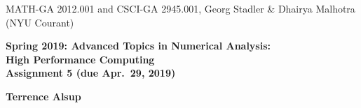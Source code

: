 \documentclass[12pt]{article}
\begin{document}
\begin{center}
  \vspace*{-2cm}
{\small MATH-GA 2012.001 and CSCI-GA 2945.001, Georg Stadler \&
  Dhairya Malhotra (NYU Courant)}
\end{center}
\vspace*{.5cm}
\begin{center}
\large \textbf{%
Spring 2019: Advanced Topics in Numerical Analysis: \\
High Performance Computing \\
Assignment 5 (due Apr.\ 29, 2019) }
\end{center}

\begin{center}
  \vspace*{0.75cm}
{\Large \textbf{Terrence Alsup}}
\end{center}
\end{document}
